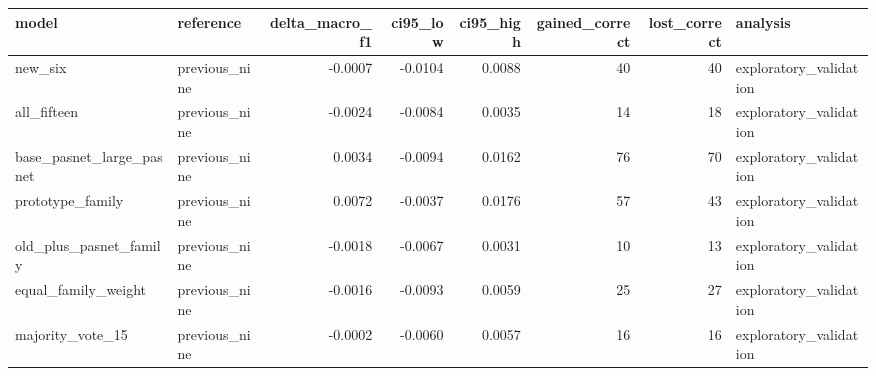 \begin{tabular}{llrrrrrl}
\toprule
model & reference & delta\_macro\_f1 & ci95\_low & ci95\_high & gained\_correct & lost\_correct & analysis \\
\midrule
new\_six & previous\_nine & -0.0007 & -0.0104 & 0.0088 & 40 & 40 & exploratory\_validation \\
all\_fifteen & previous\_nine & -0.0024 & -0.0084 & 0.0035 & 14 & 18 & exploratory\_validation \\
base\_pasnet\_large\_pasnet & previous\_nine & 0.0034 & -0.0094 & 0.0162 & 76 & 70 & exploratory\_validation \\
prototype\_family & previous\_nine & 0.0072 & -0.0037 & 0.0176 & 57 & 43 & exploratory\_validation \\
old\_plus\_pasnet\_family & previous\_nine & -0.0018 & -0.0067 & 0.0031 & 10 & 13 & exploratory\_validation \\
equal\_family\_weight & previous\_nine & -0.0016 & -0.0093 & 0.0059 & 25 & 27 & exploratory\_validation \\
majority\_vote\_15 & previous\_nine & -0.0002 & -0.0060 & 0.0057 & 16 & 16 & exploratory\_validation \\
\bottomrule
\end{tabular}
